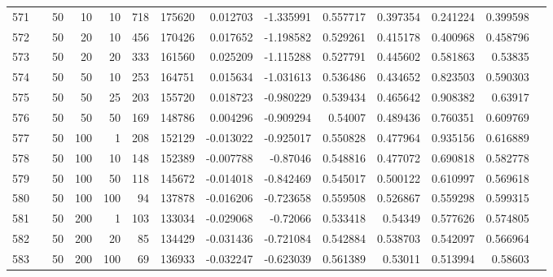 \begin{longtable}{llrrrrrrrrrrrr}
		571 & &           50 &                10 &           10 &         718 &     175620 &  0.012703 & -1.335991 &  0.557717 &    0.397354 &       0.241224 &  0.399598 \\
		572 & &           50 &                20 &           10 &         456 &     170426 &  0.017652 & -1.198582 &  0.529261 &    0.415178 &       0.400968 &  0.458796 \\
		573 & &           50 &                20 &           20 &         333 &     161560 &  0.025209 & -1.115288 &  0.527791 &    0.445602 &       0.581863 &   0.53835 \\
		574 & &           50 &                50 &           10 &         253 &     164751 &  0.015634 & -1.031613 &  0.536486 &    0.434652 &       0.823503 &  0.590303 \\
		575 & \multirow[b]{10}{*}{\rotatebox[origin=l]{90}{use-default}} &           50 &                50 &           25 &         203 &     155720 &  0.018723 & -0.980229 &  0.539434 &    0.465642 &       0.908382 &   0.63917 \\
		576 & &           50 &                50 &           50 &         169 &     148786 &  0.004296 & -0.909294 &   0.54007 &    0.489436 &       0.760351 &  0.609769 \\
		577 & &           50 &               100 &            1 &         208 &     152129 & -0.013022 & -0.925017 &  0.550828 &    0.477964 &       0.935156 &  0.616889 \\
		578 & &           50 &               100 &           10 &         148 &     152389 & -0.007788 &  -0.87046 &  0.548816 &    0.477072 &       0.690818 &  0.582778 \\
		579 & &           50 &               100 &           50 &         118 &     145672 & -0.014018 & -0.842469 &  0.545017 &    0.500122 &       0.610997 &  0.569618 \\
		580 & &           50 &               100 &          100 &          94 &     137878 & -0.016206 & -0.723658 &  0.559508 &    0.526867 &       0.559298 &  0.599315 \\
		581 & &           50 &               200 &            1 &         103 &     133034 & -0.029068 &  -0.72066 &  0.533418 &     0.54349 &       0.577626 &  0.574805 \\
		582 & &           50 &               200 &           20 &          85 &     134429 & -0.031436 & -0.721084 &  0.542884 &    0.538703 &       0.542097 &  0.566964 \\
		583 & &           50 &               200 &          100 &          69 &     136933 & -0.032247 & -0.623039 &  0.561389 &     0.53011 &       0.513994 &   0.58603 \\

\end{longtable}
